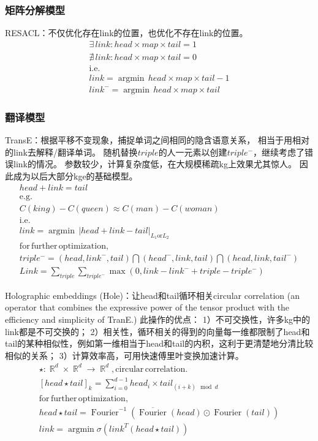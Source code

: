 \documentclass[12pt]{ctexart}
\DeclareMathOperator\argmin{argmin}
\DeclareMathOperator\eg{e.g.}
\DeclareMathOperator\ie{i.e.}
\DeclareMathOperator\R{\mathbb{R}}
\DeclareMathOperator\Fourier{Fourier}
\theoremstyle{definition}
\begin{document}
\subsubsection{矩阵分解模型}
RESACL：不仅优化存在link的位置，也优化不存在link的位置。
\[\begin{array}{l}
    \exists\, link: head\times map \times tail=1\\
    \nexists\, link: head\times map \times tail=0\\
    \ie\\
    link={\argmin}\, head\times map \times tail-1\\
    link^-={\argmin}\, head\times map \times tail
\end{array}\]

\subsubsection{翻译模型}
TransE：根据平移不变现象，捕捉单词之间相同的隐含语意关系，
相当于用相对的link去解释/翻译单词。
随机替换$triple$的人一元素以创建$triple^-$，继续考虑了错误link的情况。
参数较少，计算复杂度低，在大规模稀疏kg上效果尤其惊人。
因此成为以后大部分kge的基础模型。
\[\begin{array}{l}
    head+link=tail\\
    \eg\\
    C(king)-C(queen)\approx C(man)-C(woman)\\
    \ie\\
    link={\argmin}\, |head+link-tail|_{L_1\mathrm{or}L_2}\\
    \mathrm{for\,further\,optimization,}\\
    triple^-=(head,link^-,tail) \bigcap (head^-,link, tail) \bigcap (head, link, tail^-)\\
    Link=\sum\limits_{triple} \sum\limits_{triple^-} \max (0,link-link^-+triple-triple^-)
\end{array}\]

Holographic embeddings (Hole)：让head和tail循环相关circular correlation 
(an operator that combines the expressive power of the tensor product with the efficiency and simplicity of TranE.)
此操作的优点：
1）不可交换性，许多kg中的link都是不可交换的；
2）相关性，循环相关的得到的向量每一维都限制了head和tail的某种相似性，例如第一维相当于head和tail的内积，这利于更清楚地分清比较相似的关系；
3）计算效率高，可用快速傅里叶变换加速计算。
\[\begin{array}{l}
    \star: \R^d\times \R^d\rightarrow \R^d, \mathrm{circular\, correlation.}\\
    {[head\star tail]}_k=\sum\limits_{i=0}^{d-1} head_i \times tail_{(i+k)\mod d}\\
    \mathrm{for\,further\,optimization,}\\
    head\star tail= \Fourier^{-1}\left(\overline{\Fourier}(head)\odot \Fourier(tail)\right)\\
    link=\argmin \sigma (link^T(head\star tail))
\end{array}\]
\end{document}
